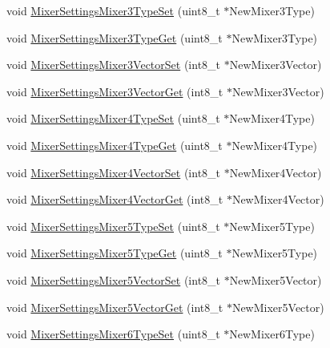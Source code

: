\begin{DoxyCompactItemize}
\item 
void \hyperlink{group___mixer_settings_ga7fe37339ff6c1169adfe29c5fce9e61b}{\-Mixer\-Settings\-Mixer3\-Type\-Set} (uint8\-\_\-t $\ast$\-New\-Mixer3\-Type)
\item 
void \hyperlink{group___mixer_settings_ga13f630f5e2ba1e3e093111aca96e0f86}{\-Mixer\-Settings\-Mixer3\-Type\-Get} (uint8\-\_\-t $\ast$\-New\-Mixer3\-Type)
\item 
void \hyperlink{group___mixer_settings_gac8a1cd14275a744e9e8d1da282ed034b}{\-Mixer\-Settings\-Mixer3\-Vector\-Set} (int8\-\_\-t $\ast$\-New\-Mixer3\-Vector)
\item 
void \hyperlink{group___mixer_settings_gae81d0539f7f2e55840a8c8f5a55e7379}{\-Mixer\-Settings\-Mixer3\-Vector\-Get} (int8\-\_\-t $\ast$\-New\-Mixer3\-Vector)
\item 
void \hyperlink{group___mixer_settings_ga79850f53e451f6f86d9c45760b982fa2}{\-Mixer\-Settings\-Mixer4\-Type\-Set} (uint8\-\_\-t $\ast$\-New\-Mixer4\-Type)
\item 
void \hyperlink{group___mixer_settings_ga3bd582d3b2f5692fbd049be8b5545d1b}{\-Mixer\-Settings\-Mixer4\-Type\-Get} (uint8\-\_\-t $\ast$\-New\-Mixer4\-Type)
\item 
void \hyperlink{group___mixer_settings_gae9fa198ff62d191b7b9386771a5f4a5b}{\-Mixer\-Settings\-Mixer4\-Vector\-Set} (int8\-\_\-t $\ast$\-New\-Mixer4\-Vector)
\item 
void \hyperlink{group___mixer_settings_gac5a4f689f5dccd29743bb790575c9adb}{\-Mixer\-Settings\-Mixer4\-Vector\-Get} (int8\-\_\-t $\ast$\-New\-Mixer4\-Vector)
\item 
void \hyperlink{group___mixer_settings_ga07ac2cbf86e753a29835420d56ca0340}{\-Mixer\-Settings\-Mixer5\-Type\-Set} (uint8\-\_\-t $\ast$\-New\-Mixer5\-Type)
\item 
void \hyperlink{group___mixer_settings_ga83bd610ec3f4a4641d294e264ab97247}{\-Mixer\-Settings\-Mixer5\-Type\-Get} (uint8\-\_\-t $\ast$\-New\-Mixer5\-Type)
\item 
void \hyperlink{group___mixer_settings_ga457df80373fa1285f5c595a5d3aeaed9}{\-Mixer\-Settings\-Mixer5\-Vector\-Set} (int8\-\_\-t $\ast$\-New\-Mixer5\-Vector)
\item 
void \hyperlink{group___mixer_settings_gaea8a64473a597f2eee225942a126d250}{\-Mixer\-Settings\-Mixer5\-Vector\-Get} (int8\-\_\-t $\ast$\-New\-Mixer5\-Vector)
\item 
void \hyperlink{group___mixer_settings_gac79c2cd9f43cdf80e5b1dc2a306230a5}{\-Mixer\-Settings\-Mixer6\-Type\-Set} (uint8\-\_\-t $\ast$\-New\-Mixer6\-Type)

\end{DoxyCompactItemize}
